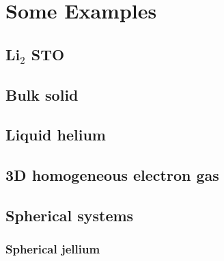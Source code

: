 \chapter{Some Examples}
\section{Li${}_2$ STO}
\section{Bulk solid}
\section{Liquid helium}
\section{3D homogeneous electron gas}
\section{Spherical systems}
\subsection{Spherical jellium}
%
